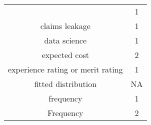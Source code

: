\documentclass[]{book}
\theoremstyle{definition}
\theoremstyle{definition}
\theoremstyle{definition}
\theoremstyle{remark}
\begin{document}
\begin{longtable}[]{@{}cc@{}}
\begin{minipage}[t]{0.43\columnwidth}
\end{minipage} & \begin{minipage}[t]{0.05\columnwidth}\centering\strut
1\strut
\end{minipage}\tabularnewline
\begin{minipage}[t]{0.43\columnwidth}\centering\strut
claims leakage\strut
\end{minipage} & \begin{minipage}[t]{0.05\columnwidth}\centering\strut
1\strut
\end{minipage}\tabularnewline
\begin{minipage}[t]{0.43\columnwidth}\centering\strut
data science\strut
\end{minipage} & \begin{minipage}[t]{0.05\columnwidth}\centering\strut
1\strut
\end{minipage}\tabularnewline
\begin{minipage}[t]{0.43\columnwidth}\centering\strut
expected cost\strut
\end{minipage} & \begin{minipage}[t]{0.05\columnwidth}\centering\strut
2\strut
\end{minipage}\tabularnewline
\begin{minipage}[t]{0.43\columnwidth}\centering\strut
experience rating or merit rating\strut
\end{minipage} & \begin{minipage}[t]{0.05\columnwidth}\centering\strut
1\strut
\end{minipage}\tabularnewline
\begin{minipage}[t]{0.43\columnwidth}\centering\strut
fitted distribution\strut
\end{minipage} & \begin{minipage}[t]{0.05\columnwidth}\centering\strut
NA\strut
\end{minipage}\tabularnewline
\begin{minipage}[t]{0.43\columnwidth}\centering\strut
frequency\strut
\end{minipage} & \begin{minipage}[t]{0.05\columnwidth}\centering\strut
1\strut
\end{minipage}\tabularnewline
\begin{minipage}[t]{0.43\columnwidth}\centering\strut
Frequency\strut
\end{minipage} & \begin{minipage}[t]{0.05\columnwidth}\centering\strut
2\strut
\end{minipage}\tabularnewline

\end{longtable}
\end{document}
